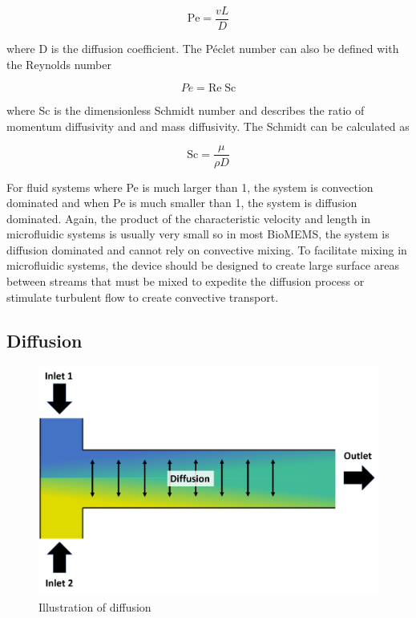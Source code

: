 \begin{equation}
    \text{Pe} = \frac{vL}{D}
\end{equation}

\noindent where D is the diffusion coefficient. The P\'eclet number can also be defined with the Reynolds number

\begin{equation}
    Pe = \text{Re}\;\text{Sc}
\end{equation}

\noindent where Sc is the dimensionless Schmidt number and describes the ratio of momentum diffusivity and and mass diffusivity. The Schmidt can be calculated as

\begin{equation}
    \text{Sc} = \frac{\mu}{\rho D}
\end{equation}

\par For fluid systems where Pe is much larger than 1, the system is convection dominated and when Pe is much smaller than 1, the system is diffusion dominated. Again, the product of the characteristic velocity and length in microfluidic systems is usually very small so in most BioMEMS, the system is diffusion dominated and cannot rely on convective mixing. To facilitate mixing in microfluidic systems, the device should be designed to create large surface areas between streams that must be mixed to expedite the diffusion process or stimulate turbulent flow to create convective transport.

\subsection*{Diffusion}

\begin{figure}[ht]
    \centering
    \includegraphics[width=\textwidth]{images/diffusion_illustration.png}
    \caption{Illustration of diffusion}
    \label{fig:diffusion_ilustration}
\end{figure} 



